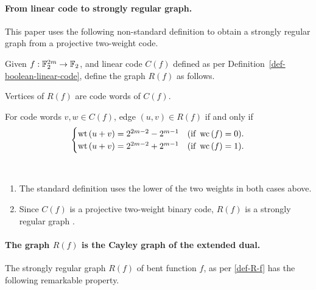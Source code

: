%
\paragraph*{From linear code to strongly regular graph.}
This paper uses the following non-standard definition to obtain a strongly regular graph from a
projective two-weight code.
\begin{Definition}
\label{def-R-f}
Given $f : \mathbb{F}_2^{2m} \rightarrow \mathbb{F}_2$, and linear code $C(f)$ defined as per Definition~\ref{def-boolean-linear-code},
define the graph $R(f)$ as follows.

Vertices of $R(f)$ are code words of $C(f)$.

For code words $v,w \in C(f)$, edge $(u,v) \in R(f)$ if and only if
\begin{align*}
\begin{cases}
\operatorname{wt}\left(u+v\right) = 2^{2m-2} - 2^{m-1} & (\text{if~}\operatorname{wc}\left(f\right)=0).
\\
\operatorname{wt}\left(u+v\right) = 2^{2m-2} + 2^{m-1} & (\text{if~}\operatorname{wc}\left(f\right)=1).
\end{cases}
\end{align*}

\end{Definition}
\begin{remarks}~

\begin{enumerate}
 \item
The standard definition uses the lower of the two weights in both cases above.
 \item
Since $C(f)$ is a projective two-weight binary code,
$R(f)$ is a strongly regular graph \cite[Theorem 2]{Del72weights} \cite[Theorem 16.22]{CamVL91}.
\end{enumerate}
\end{remarks}





\paragraph*{The graph $R(f)$ is the Cayley graph of the extended dual.}
The strongly regular graph $R(f)$ of bent function $f$, as per
\ref{def-R-f} has the following remarkable property.

